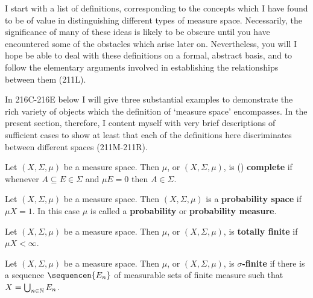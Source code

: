      
\def\chaptername{Taxonomy of measure spaces}
\def\sectionname{Definitions}
     
     
I start with a list of definitions, corresponding to the concepts which
I have found to be of value in distinguishing different types of measure
space.   Necessarily, the significance of many of these ideas is likely
to be obscure until you have encountered some of the obstacles which
arise later on.   Nevertheless, you will I hope be
able to deal with these definitions on a formal, abstract basis, and to
follow the elementary arguments involved in establishing the
relationships between them (211L).
     
In 216C-216E %
below I will give three substantial examples to demonstrate the rich variety of objects which the definition of `measure space'
encompasses.   In the present section, therefore, I content myself with
very brief descriptions of sufficient cases to show at least that
each of the definitions here discriminates between different spaces
(211M-211R).
     
 Let $(X,\Sigma,\mu)$ be a measure space.
Then $\mu$, or $(X,\Sigma,\mu)$, is ({\bf \Caratheodory}) {\bf complete} if whenever
$A\subseteq E\in\Sigma$ and $\mu E=0$ then $A\in\Sigma$.
     
 Let $(X,\Sigma,\mu)$ be a measure space.
Then $(X,\Sigma,\mu)$ is a {\bf probability space} if $\mu X=1$.
In this case $\mu$ is called a {\bf probability} or {\bf probability
measure}.
     
 Let $(X,\Sigma,\mu)$ be a measure space.
Then $\mu$, or $(X,\Sigma,\mu)$, is {\bf totally finite} if $\mu
X<\infty$.
     
 Let $(X,\Sigma,\mu)$ be a measure space.
Then $\mu$, or $(X,\Sigma,\mu)$, is {\bf $\sigma$-finite} if there is a
sequence $\sequencen{E_n}$ of measurable sets of finite measure such
that $X=\bigcup_{n\in\Bbb N}E_n$.
     
     
